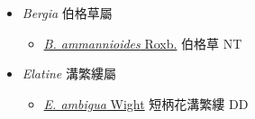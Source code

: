 
  \begin{itemize}
 \item[] \textit{Bergia} 伯格草屬
                    
  \begin{itemize}
        \item[] \href{http://www.theplantlist.org/tpl1.1/search?q=Bergia+ammannioides}{\textit{B. ammannioides} Roxb.}   伯格草 NT
  \end{itemize}
 \item[] \textit{Elatine} 溝繁縷屬
                    
  \begin{itemize}
        \item[] \href{http://www.theplantlist.org/tpl1.1/search?q=Elatine+ambigua}{\textit{E. ambigua} Wight}   短柄花溝繁縷 DD
  \end{itemize}
  \end{itemize}
